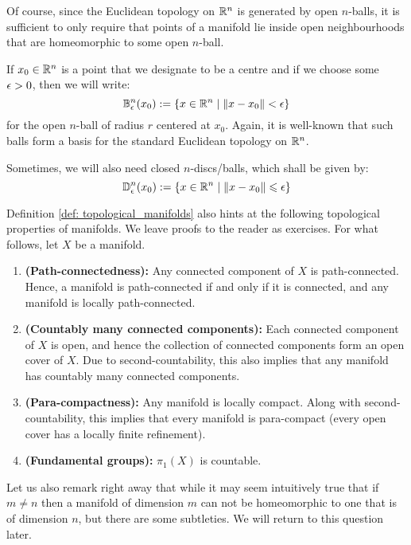         Of course, since the Euclidean topology on $\mathbb{R}^n$ is generated by open $n$-balls, it is sufficient to only require that points of a manifold lie inside open neighbourhoods that are homeomorphic to some open $n$-ball.
        \begin{convention}
            If $x_0 \in \mathbb{R}^n$ is a point that we designate to be a centre and if we choose some $\epsilon > 0$, then we will write:
                $$\mathbb{B}^n_\epsilon(x_0) := \{ x \in \mathbb{R}^n \mid \| x - x_0 \| < \epsilon \}$$
            for the open $n$-ball of radius $r$ centered at $x_0$. Again, it is well-known that such balls form a basis for the standard Euclidean topology on $\mathbb{R}^n$.

            Sometimes, we will also need closed $n$-discs/balls, which shall be given by:
                $$\mathbb{D}^n_\epsilon(x_0) := \{ x \in \mathbb{R}^n \mid \| x - x_0 \| \leqslant \epsilon \}$$
        \end{convention}
        \begin{remark}
            Definition \ref{def: topological_manifolds} also hints at the following topological properties of manifolds. We leave proofs to the reader as exercises. For what follows, let $X$ be a manifold.
            \begin{enumerate}
                \item \textbf{(Path-connectedness):} Any connected component of $X$ is path-connected. Hence, a manifold is path-connected if and only if it is connected, and any manifold is locally path-connected.
                \item \textbf{(Countably many connected components):} Each connected component of $X$ is open, and hence the collection of connected components form an open cover of $X$. Due to second-countability, this also implies that any manifold has countably many connected components.
                \item \textbf{(Para-compactness):} Any manifold is locally compact. Along with second-countability, this implies that every manifold is para-compact (every open cover has a locally finite refinement).
                \item \textbf{(Fundamental groups):} $\pi_1(X)$ is countable.
            \end{enumerate}
        \end{remark}

        Let us also remark right away that while it may seem intuitively true that if $m \not = n$ then a manifold of dimension $m$ can not be homeomorphic to one that is of dimension $n$, but there are some subtleties. We will return to this question later.

